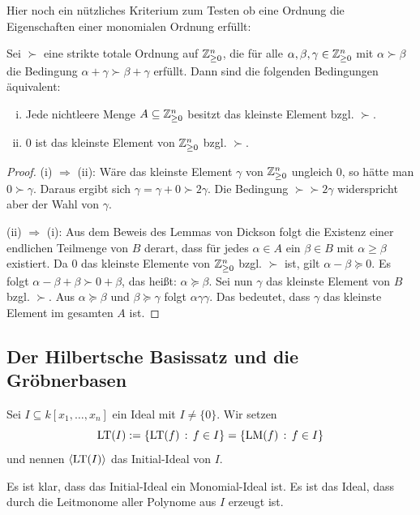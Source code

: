 \documentclass[11pt]{article}
\numberwithin{equation}{section}
\begin{document}
Hier noch ein nützliches Kriterium zum Testen ob eine Ordnung die Eigenschaften einer monomialen Ordnung erfüllt: 
\begin{corollary}
		Sei $\succ$ eine strikte totale Ordnung auf $\mathbb{Z}_{\ge 0}^n$, die für alle $\alpha, \beta, \gamma \in \mathbb{Z}_{\ge 0}^n$ mit $\alpha \succ \beta$ die Bedingung $\alpha + \gamma \succ \beta + \gamma$ erfüllt. 
		Dann sind die folgenden Bedingungen äquivalent: 
		\begin{enumerate}[(i)] 
			\item Jede nichtleere Menge $A \subseteq \mathbb{Z}_{\ge 0}^n$ besitzt das kleinste Element bzgl. $\succ$. 
			\item $0$ ist das kleinste Element von $\mathbb{Z}_{\ge 0}^n$ bzgl. $\succ$. 
		\end{enumerate} 
\end{corollary} 
\begin{proof} 
	(i) $\Rightarrow$ (ii): Wäre das kleinste Element $\gamma$  von $\mathbb{Z}_{\ge 0}^n$ ungleich $0$, so hätte man $0 \succ \gamma$. Daraus ergibt sich $\gamma = \gamma + 0 \succ 2 \gamma$. Die Bedingung $\succ \succ 2 \gamma$ widerspricht aber der Wahl von $\gamma$. 
	
	(ii) $\Rightarrow$ (i): Aus dem Beweis des Lemmas von Dickson folgt die Existenz einer endlichen Teilmenge von $B$ derart, dass für jedes $\alpha \in A$ ein $\beta \in B$ mit $\alpha \ge \beta$ existiert. Da $0$ das kleinste Elemente von $\mathbb{Z}_{\ge 0}^n$ bzgl. $\succ$ ist, gilt $\alpha - \beta \succeq 0$. Es folgt $\alpha - \beta + \beta \succ 0 + \beta$, das heißt: $\alpha \succeq \beta$. Sei nun $\gamma$ das kleinste Element von $B$ bzgl. $\succ$. Aus $\alpha \succeq \beta$ und $\beta \succeq \gamma$ folgt $\alpha \gamma \gamma$. Das bedeutet, dass $\gamma$ das kleinste Element im gesamten $A$ ist. 
\end{proof} 

\subsection{Der Hilbertsche Basissatz und die Gröbnerbasen} 

\begin{definition} 
		Sei $I \subseteq k[x_1,\ldots,x_n]$ ein Ideal mit $I \ne \{0\}$. Wir setzen 
		\[
			\operatorname{LT}(I) := \left\{  \operatorname{LT}(f) \,:\,  f \in I \right\} = \left\{  \operatorname{LM}(f) \,:\, f \in I \right\} 
		\]
		und nennen $\left< \operatorname{LT}(I) \right>$ das Initial-Ideal von $I$. 
\end{definition} 

Es ist klar, dass das Initial-Ideal ein Monomial-Ideal ist. Es ist das Ideal, dass durch die Leitmonome aller Polynome aus $I$ erzeugt ist. 
\end{document}
